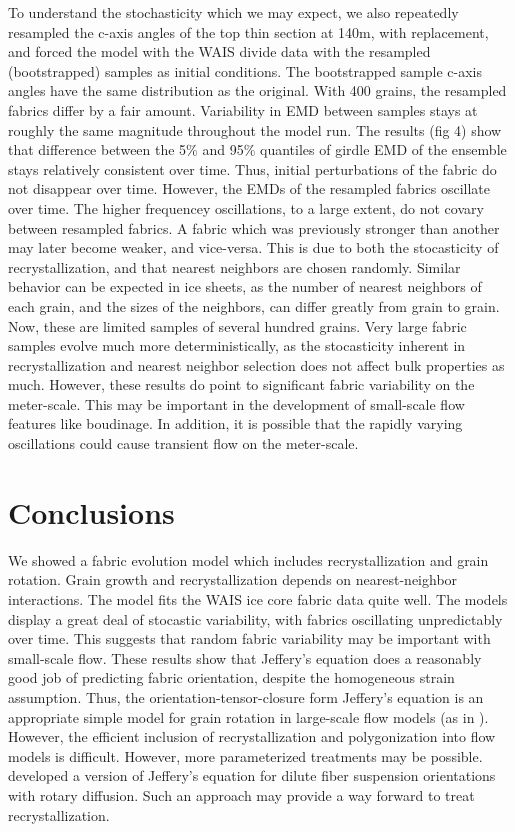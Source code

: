 \documentclass[TC, hvmath, online]{copernicus}
\begin{document}
{To understand the stochasticity which we may expect, we also repeatedly resampled the c-axis angles of the top thin section at 140m, with replacement, and forced the model with the WAIS divide data with the resampled (bootstrapped) samples as initial conditions. The bootstrapped sample c-axis angles have the same distribution as the original. With 400 grains, the resampled fabrics differ by a fair amount. Variability in EMD between samples stays at roughly the same magnitude throughout the model run. The results (fig 4) show that difference between the 5\% and 95\% quantiles of girdle EMD of the ensemble stays relatively consistent over time. Thus, initial perturbations of the fabric do not disappear over time.  However, the EMDs of the resampled fabrics oscillate over time. The higher frequencey oscillations, to a large extent, do not covary between resampled fabrics. A fabric which was previously stronger than another may later become weaker, and vice-versa. This is due to both the stocasticity of recrystallization, and that nearest neighbors are chosen randomly. Similar behavior can be expected in ice sheets, as the number of nearest neighbors of each grain, and the sizes of the neighbors, can differ greatly from grain to grain. Now, these are limited samples of several hundred grains. Very large fabric samples evolve much more deterministically, as the stocasticity inherent in recrystallization and nearest neighbor selection does not affect bulk properties as much. However, these results do point to significant fabric variability on the meter-scale. This may be important in the development of small-scale flow features like boudinage. In addition, it is possible that the rapidly varying oscillations could cause transient flow on the meter-scale. 


\section{Conclusions}
We showed a fabric evolution model which includes recrystallization and grain rotation. Grain growth and recrystallization depends on nearest-neighbor interactions. The model fits the WAIS ice core fabric data quite well. The models display a great deal of stocastic variability, with fabrics oscillating unpredictably over time. This suggests that random fabric variability may be important with small-scale flow. These results show that Jeffery's equation does a reasonably good job of predicting fabric orientation, despite the homogeneous strain assumption. Thus, the orientation-tensor-closure form  Jeffery's equation is an appropriate simple model for grain rotation in large-scale flow models (as in \citet{gillet2006}). However, the efficient inclusion of recrystallization and polygonization into flow models is difficult. However, more parameterized treatments may be possible. \citet{folgar1984} developed a version of Jeffery's equation for dilute fiber suspension orientations with rotary diffusion. Such an approach may provide a way forward to treat recrystallization. 

}
\end{document}

